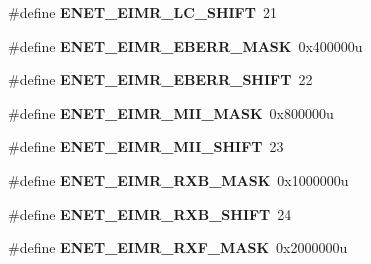 \begin{DoxyCompactItemize}
\item 
\#define {\bfseries E\+N\+E\+T\+\_\+\+E\+I\+M\+R\+\_\+\+L\+C\+\_\+\+S\+H\+I\+FT}~21\hypertarget{group__ENET__Register__Masks_gac03f587cafc7bd0f14a6fefd20652d22}{}\label{group__ENET__Register__Masks_gac03f587cafc7bd0f14a6fefd20652d22}

\item 
\#define {\bfseries E\+N\+E\+T\+\_\+\+E\+I\+M\+R\+\_\+\+E\+B\+E\+R\+R\+\_\+\+M\+A\+SK}~0x400000u\hypertarget{group__ENET__Register__Masks_ga3934d5654ba643ea4b989b299418dc22}{}\label{group__ENET__Register__Masks_ga3934d5654ba643ea4b989b299418dc22}

\item 
\#define {\bfseries E\+N\+E\+T\+\_\+\+E\+I\+M\+R\+\_\+\+E\+B\+E\+R\+R\+\_\+\+S\+H\+I\+FT}~22\hypertarget{group__ENET__Register__Masks_ga37f7aee11fab88919e4c11f1a916bdb4}{}\label{group__ENET__Register__Masks_ga37f7aee11fab88919e4c11f1a916bdb4}

\item 
\#define {\bfseries E\+N\+E\+T\+\_\+\+E\+I\+M\+R\+\_\+\+M\+I\+I\+\_\+\+M\+A\+SK}~0x800000u\hypertarget{group__ENET__Register__Masks_ga76b5d13b0a814e6201d6d4815bf5afbd}{}\label{group__ENET__Register__Masks_ga76b5d13b0a814e6201d6d4815bf5afbd}

\item 
\#define {\bfseries E\+N\+E\+T\+\_\+\+E\+I\+M\+R\+\_\+\+M\+I\+I\+\_\+\+S\+H\+I\+FT}~23\hypertarget{group__ENET__Register__Masks_gaa6d43005c24a4fc636a2c1310aae4225}{}\label{group__ENET__Register__Masks_gaa6d43005c24a4fc636a2c1310aae4225}

\item 
\#define {\bfseries E\+N\+E\+T\+\_\+\+E\+I\+M\+R\+\_\+\+R\+X\+B\+\_\+\+M\+A\+SK}~0x1000000u\hypertarget{group__ENET__Register__Masks_gade7a0df0826b6d0c11f3b0e545e17535}{}\label{group__ENET__Register__Masks_gade7a0df0826b6d0c11f3b0e545e17535}

\item 
\#define {\bfseries E\+N\+E\+T\+\_\+\+E\+I\+M\+R\+\_\+\+R\+X\+B\+\_\+\+S\+H\+I\+FT}~24\hypertarget{group__ENET__Register__Masks_gab1b2e526363f6abb22c5d228e8bfb461}{}\label{group__ENET__Register__Masks_gab1b2e526363f6abb22c5d228e8bfb461}

\item 
\#define {\bfseries E\+N\+E\+T\+\_\+\+E\+I\+M\+R\+\_\+\+R\+X\+F\+\_\+\+M\+A\+SK}~0x2000000u\hypertarget{group__ENET__Register__Masks_gaa22528ac89efc6fe663951b8c3eac045}{}\label{group__ENET__Register__Masks_gaa22528ac89efc6fe663951b8c3eac045}


\end{DoxyCompactItemize}
